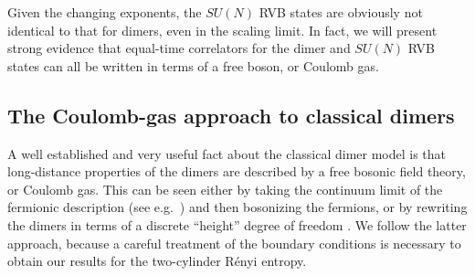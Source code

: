 \documentclass[11pt]{iopart}
\begin{document}
Given the changing exponents, the $SU(N)$ RVB states are obviously not identical to that for dimers, even in the scaling limit. In fact, we will present strong evidence that equal-time correlators for the dimer and $SU(N)$ RVB states can all be written in terms of a free boson, or Coulomb gas. 

\subsection{The Coulomb-gas approach to classical dimers}
\label{sec:cg}

A well established and very useful fact about the classical dimer model is that long-distance properties of the dimers are described by a free bosonic field theory, or Coulomb gas. This can be seen either by taking the continuum limit of the fermionic description (see e.g.\ \cite{FMS}) and then bosonizing the fermions, or by rewriting the dimers in terms of a discrete ``height'' degree of freedom \cite{Heights_1,Heights_2,Henley}. We follow the latter approach, because a careful treatment of the boundary conditions is necessary to obtain our results for the two-cylinder R\'enyi entropy. 
\end{document}
